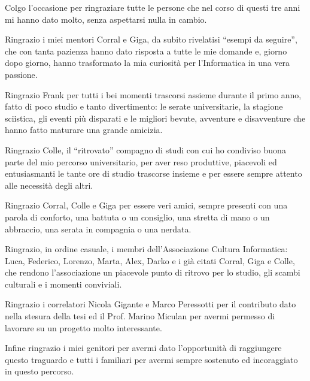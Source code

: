 
Colgo l’occasione per ringraziare tutte le persone che nel corso di questi tre anni mi hanno dato molto, senza aspettarsi nulla in cambio.

Ringrazio i miei mentori Corral e Giga, da subito rivelatisi ``esempi da seguire'', che con tanta pazienza hanno dato risposta a tutte le mie domande e, giorno dopo giorno, hanno trasformato la mia curiosità per l’Informatica in una vera passione.

Ringrazio Frank per tutti i bei momenti trascorsi assieme durante il primo anno, fatto di poco studio e tanto divertimento: le serate universitarie, la stagione sciistica, gli eventi più disparati e le migliori bevute, avventure e disavventure che hanno fatto maturare una grande amicizia.

Ringrazio Colle, il ``ritrovato'' compagno di studi con cui ho condiviso buona parte del mio percorso universitario, per aver reso produttive, piacevoli ed entusiasmanti le tante ore di studio trascorse insieme e per essere sempre attento alle necessità degli altri.

Ringrazio Corral, Colle e Giga per essere veri amici, sempre presenti con una parola di conforto, una battuta o un consiglio, una stretta di mano o un abbraccio, una serata in compagnia o una nerdata.

Ringrazio, in ordine casuale, i membri dell’Associazione Cultura Informatica: Luca, Federico, Lorenzo, Marta, Alex, Darko e i già citati Corral, Giga e Colle, che rendono l’associazione un piacevole punto di ritrovo per lo studio, gli scambi culturali e i momenti conviviali.

Ringrazio i correlatori Nicola Gigante e Marco Peressotti per il contributo dato nella stesura della tesi ed il Prof. Marino Miculan per avermi permesso di lavorare su un progetto molto interessante. 

Infine ringrazio i miei genitori per avermi dato l’opportunità di raggiungere questo traguardo e tutti i familiari per avermi sempre sostenuto ed incoraggiato in questo percorso.